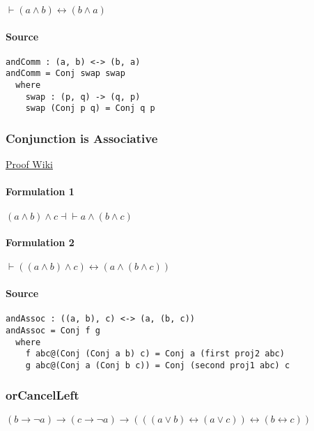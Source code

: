 \documentclass{acm_proc_article-sp}
\renewcommand{\iff}{\leftrightarrow}
\renewcommand{\implies}{\rightarrow}
\begin{document}
\(\vdash (a \land b) \iff (b \land a)\)

\paragraph{Source}\label{source}

\begin{verbatim}
andComm : (a, b) <-> (b, a)
andComm = Conj swap swap
  where
    swap : (p, q) -> (q, p)
    swap (Conj p q) = Conj q p
\end{verbatim}

\subsubsection{Conjunction is
Associative}\label{conjunction-is-associative}

\href{https://proofwiki.org/wiki/Rule_of_Association/Conjunction}{Proof Wiki}

\paragraph{Formulation 1}\label{formulation-1-2}

\((a \land b) \land c \dashv\vdash a \land (b \land c)\)

\paragraph{Formulation 2}\label{formulation-2}

\(\vdash ((a \land b) \land c) \iff (a \land (b \land c))\)

\paragraph{Source}\label{source-1}

\begin{verbatim}
andAssoc : ((a, b), c) <-> (a, (b, c))
andAssoc = Conj f g
  where
    f abc@(Conj (Conj a b) c) = Conj a (first proj2 abc)
    g abc@(Conj a (Conj b c)) = Conj (second proj1 abc) c
\end{verbatim}

\subsubsection{orCancelLeft}\label{orcancelleft}

\((b \implies \neg a) \implies (c \implies \neg a) \implies (((a \lor b) \iff (a \lor c)) \iff (b \iff c))\)
\end{document}
